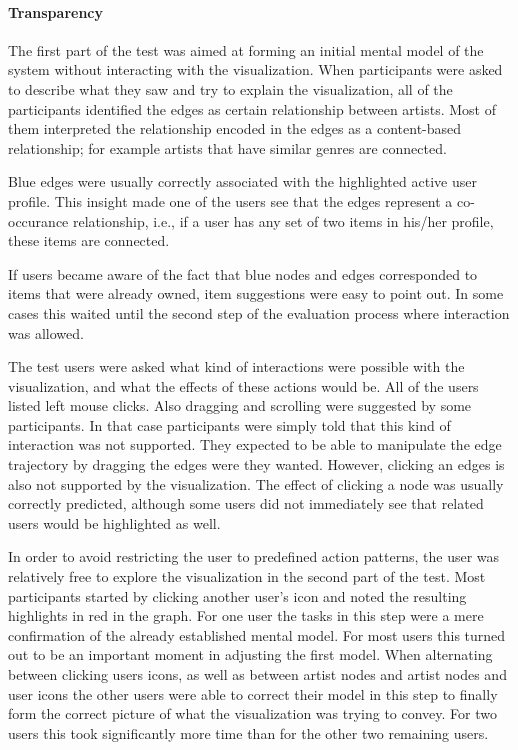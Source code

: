 \paragraph{Transparency}

The first part of the test was aimed at forming an initial mental model of the system without interacting with the visualization. When participants were asked to describe what they saw and try to explain the visualization, all of the participants identified the edges as certain relationship between artists. Most of them interpreted the relationship encoded in the edges as a content-based relationship; for example artists that have similar genres are connected.

Blue edges were usually correctly associated with the highlighted active user profile. This insight made one of the users see that the edges represent a co-occurance relationship, i.e., if a user has any set of two items in his/her profile, these items are connected.

If users became aware of the fact that blue nodes and edges corresponded to items that were already owned, item suggestions were easy to point out. In some cases this waited until the second step of the evaluation process where interaction was allowed.

The test users were asked what kind of interactions were possible with the visualization, and what the effects of these actions would be. All of the users listed left mouse clicks. Also dragging and scrolling were suggested by some participants. In that case participants were simply told that this kind of interaction was not supported. They expected to be able to manipulate the edge trajectory by dragging the edges were they wanted. However, clicking an edges is also not supported by the visualization. The effect of clicking a node was usually correctly predicted, although some users did not immediately see that related users would be highlighted as well.

In order to avoid restricting the user to predefined action patterns, the user was relatively free to explore the visualization in the second part of the test. Most participants started by clicking another user's icon and noted the resulting highlights in red in the graph. For one user the tasks in this step were a mere confirmation of the already established mental model. For most users this turned out to be an important moment in adjusting the first model. When alternating between clicking users icons, as well as between artist nodes and artist nodes and user icons the other users were able to correct their model in this step to finally form the correct picture of what the visualization was trying to convey. For two users this took significantly more time than for the other two remaining users.

